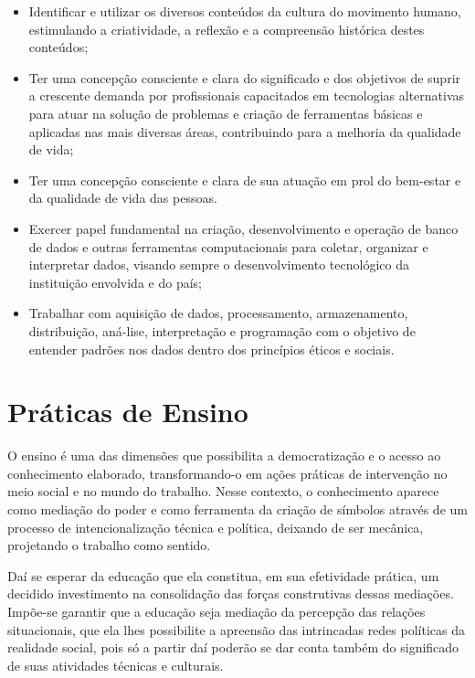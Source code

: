 \documentclass[a4paper, 12pt, openright, oneside, german, french, english, brazil]{abntex2}
\begin{document}
\begin{itemize}
\item Identificar e utilizar os diversos conteúdos da cultura do movimento humano, estimulando a criatividade, a reflexão e a compreensão histórica destes conteúdos;
\item Ter uma concepção consciente e clara do significado e dos objetivos de suprir a crescente demanda por profissionais capacitados em tecnologias alternativas para atuar na solução de problemas e criação de ferramentas básicas e aplicadas nas mais diversas áreas, contribuindo para a melhoria da qualidade de vida;
\item Ter uma concepção consciente e clara de sua atuação em prol do bem-estar e da qualidade de vida das pessoas.
\item Exercer papel fundamental na criação, desenvolvimento e operação de banco de dados e outras ferramentas computacionais para coletar, organizar e interpretar dados, visando sempre o desenvolvimento tecnológico da instituição envolvida e do país;
\item Trabalhar com aquisição de dados, processamento, armazenamento, distribuição, aná-lise, interpretação e programação com o objetivo de entender padrões nos dados dentro dos princípios éticos e sociais.
\end{itemize}

\chapter{Práticas de Ensino}

O ensino é uma das dimensões que possibilita a democratização e o acesso ao conhecimento elaborado, transformando-o em ações práticas de intervenção no meio social e no mundo do trabalho. Nesse contexto, o conhecimento aparece como mediação do poder e como ferramenta da criação de símbolos através de um processo de intencionalização técnica e política, deixando de ser mecânica, projetando o trabalho como sentido.

Daí se esperar da educação que ela constitua, em sua efetividade prática, um decidido investimento na consolidação das forças construtivas dessas mediações. Impõe-se garantir que a educação seja mediação da percepção das relações situacionais, que ela lhes possibilite a apreensão das intrincadas redes políticas da realidade social, pois só a partir daí poderão se dar conta também do significado de suas atividades técnicas e culturais.
\end{document}
